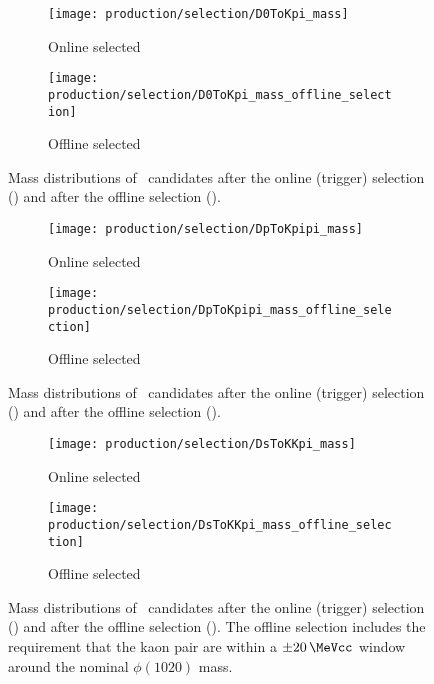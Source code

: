 \begin{figure}
  \begin{subfigure}[b]{0.5\textwidth}
    \centering
    \texttt{[image: production/selection/D0ToKpi\_mass]}
    \caption{Online selected}
    \label{fig:prod:sel:D0ToKpi:online}
  \end{subfigure}
  \begin{subfigure}[b]{0.5\textwidth}
    \centering
    \texttt{[image: production/selection/D0ToKpi\_mass\_offline\_selection]}
    \caption{Offline selected}
    \label{fig:prod:sel:D0ToKpi:offline}
  \end{subfigure}
  \caption{%
    Mass distributions of \DzToKpi\ candidates after the online (trigger) 
    selection () and after the offline 
    selection ().
  }
  \label{fig:prod:sel:D0ToKpi}
\end{figure}

\begin{figure}
  \begin{subfigure}[b]{0.5\textwidth}
    \centering
    \texttt{[image: production/selection/DpToKpipi\_mass]}
    \caption{Online selected}
    \label{fig:prod:sel:DpToKpipi:online}
  \end{subfigure}
  \begin{subfigure}[b]{0.5\textwidth}
    \centering
    \texttt{[image: production/selection/DpToKpipi\_mass\_offline\_selection]}
    \caption{Offline selected}
    \label{fig:prod:sel:DpToKpipi:offline}
  \end{subfigure}
  \caption{%
    Mass distributions of \DpToKpipi\ candidates after the online (trigger) 
    selection () and after the offline 
    selection ().
  }
  \label{fig:prod:sel:DpToKpipi}
\end{figure}

\begin{figure}
  \begin{subfigure}[b]{0.5\textwidth}
    \centering
    \texttt{[image: production/selection/DsToKKpi\_mass]}
    \caption{Online selected}
    \label{fig:prod:sel:DsToKKpi:online}
  \end{subfigure}
  \begin{subfigure}[b]{0.5\textwidth}
    \centering
    \texttt{[image: production/selection/DsToKKpi\_mass\_offline\_selection]}
    \caption{Offline selected}
    \label{fig:prod:sel:DsToKKpi:offline}
  \end{subfigure}
  \caption{%
    Mass distributions of \DspToKKpi\ candidates after the online (trigger) 
    selection () and after the offline 
    selection ().
    The offline selection includes the requirement that the kaon pair are 
    within a $\pm\SI{20}{\MeVcc}$ window around the nominal $\phi(1020)$ mass.
  }
  \label{fig:prod:sel:DsToKKpi}
\end{figure}

